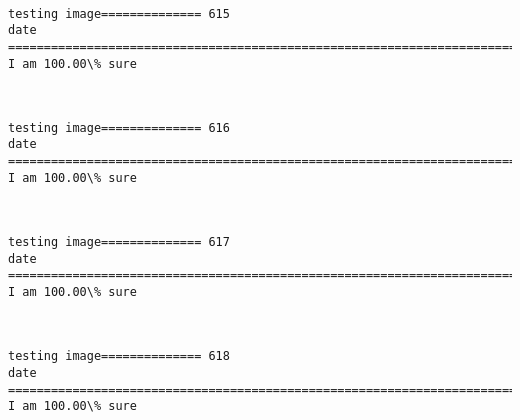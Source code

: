 \documentclass[11pt]{article}
\begin{document}
    \begin{center}
    \end{center}
    { \hspace*{\fill} \\}
    
    \begin{Verbatim}[commandchars=\\\{\}]
testing image============== 615
date
============================================================================
I am 100.00\% sure

    \end{Verbatim}

    \begin{center}
    \end{center}
    { \hspace*{\fill} \\}
    
    \begin{Verbatim}[commandchars=\\\{\}]
testing image============== 616
date
============================================================================
I am 100.00\% sure

    \end{Verbatim}

    \begin{center}
    \end{center}
    { \hspace*{\fill} \\}
    
    \begin{Verbatim}[commandchars=\\\{\}]
testing image============== 617
date
============================================================================
I am 100.00\% sure

    \end{Verbatim}

    \begin{center}
    \end{center}
    { \hspace*{\fill} \\}
    
    \begin{Verbatim}[commandchars=\\\{\}]
testing image============== 618
date
============================================================================
I am 100.00\% sure

    \end{Verbatim}
\end{document}
